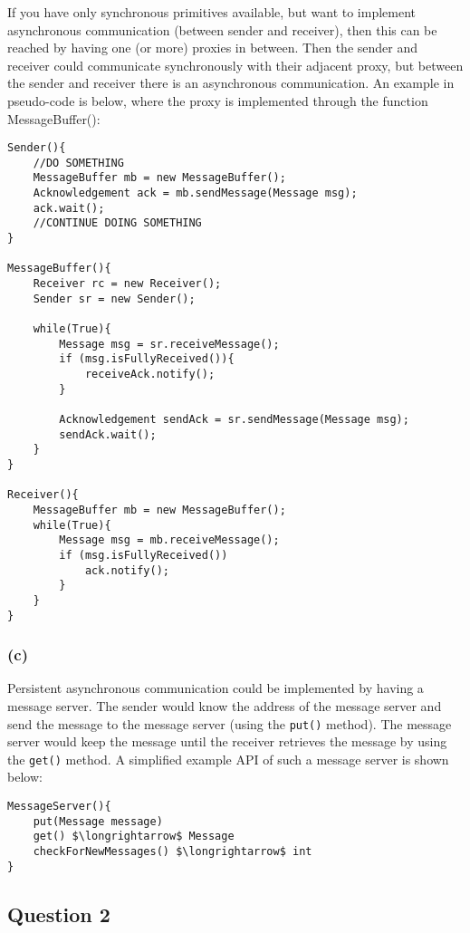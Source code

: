\documentclass[12pt,a4paper,fleqn]{article}
\begin{document}
If you have only synchronous primitives available, but want to implement asynchronous communication (between sender and receiver), then this can be reached by having one (or more) proxies in between. Then the sender and receiver could communicate synchronously with their adjacent proxy, but between the sender and receiver there is an asynchronous communication. An example in pseudo-code is below, where the proxy is implemented through the function MessageBuffer():

\begin{lstlisting}[basicstyle=\footnotesize,breaklines=true]
Sender(){
	//DO SOMETHING
	MessageBuffer mb = new MessageBuffer();
	Acknowledgement ack = mb.sendMessage(Message msg);
	ack.wait();
	//CONTINUE DOING SOMETHING
}

MessageBuffer(){
	Receiver rc = new Receiver();
	Sender sr = new Sender();
	
	while(True){
		Message msg = sr.receiveMessage();
		if (msg.isFullyReceived()){
			receiveAck.notify();
		}
		
		Acknowledgement sendAck = sr.sendMessage(Message msg);
		sendAck.wait();
	}
}

Receiver(){
	MessageBuffer mb = new MessageBuffer();
	while(True){
		Message msg = mb.receiveMessage();
		if (msg.isFullyReceived())
			ack.notify();
		}
	}
}
\end{lstlisting}

\subsubsection*{(c)}
Persistent asynchronous communication could be implemented by having a message server. The sender would know the address of the message server and send the message to the message server (using the \texttt{put()} method). The message server would keep the message until the receiver retrieves the message by using the \texttt{get()} method. A simplified example API of such a message server is shown below:

\begin{lstlisting}[basicstyle=\footnotesize,breaklines=true,mathescape]
MessageServer(){
    put(Message message)
    get() $\longrightarrow$ Message
    checkForNewMessages() $\longrightarrow$ int
}
\end{lstlisting}


\subsection*{Question 2}
\label{sec:eq2}
\end{document}
